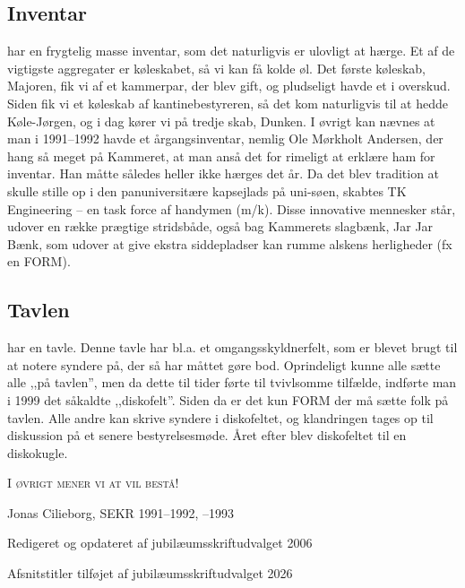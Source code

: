 \subsection{Inventar}
\TKET har en frygtelig masse inventar, som det naturligvis er ulovligt at hærge. Et af de vigtigste aggregater er køleskabet, så vi kan få kolde øl. Det første køleskab, Majoren, fik vi af et kammerpar, der blev gift, og pludseligt havde et i overskud. Siden fik vi et køleskab af kantinebestyreren, så det kom naturligvis til at hedde Køle-Jørgen, og i dag kører vi på tredje skab, Dunken. I øvrigt kan nævnes at man i 1991--1992 havde et årgangsinventar, nemlig Ole Mørkholt Andersen, der hang så meget på Kammeret, at man anså det for rimeligt at erklære ham for inventar. Han måtte således heller ikke hærges det år. Da det blev tradition at \TKET skulle stille op i den panuniversitære kapsejlads på uni-søen, skabtes TK Engineering -- en task force af handymen (m/k). Disse innovative mennesker står, udover en række prægtige stridsbåde, også bag Kammerets slagbænk, Jar Jar Bænk, som udover at give ekstra siddepladser kan rumme alskens herligheder (fx en FORM).

\subsection{Tavlen}
\TKET har en tavle. Denne tavle har bl.a. et omgangsskyldnerfelt, som er blevet brugt til at notere syndere på, der så har måttet gøre bod. Oprindeligt kunne alle sætte alle ,,på tavlen'', men da dette til tider førte til tvivlsomme tilfælde, indførte man i 1999 det såkaldte ,,diskofelt''. Siden da er det kun FORM der må sætte folk på tavlen. Alle andre kan skrive syndere i diskofeltet, og klandringen tages op til diskussion på et senere bestyrelsesmøde. Året efter blev diskofeltet til en diskokugle.

\begin{center}
    \scshape{I øvrigt mener vi at \TKET vil bestå!}
\end{center}

\vspace{24pt}
\begin{flushright}
    Jonas Cilieborg, SEKR 1991--1992, --1993
    
    \vspace{5pt}Redigeret og opdateret af jubilæumsskriftudvalget 2006
    
    \vspace{5pt}Afsnitstitler tilføjet af jubilæumsskriftudvalget 2026
\end{flushright}
\vfill
